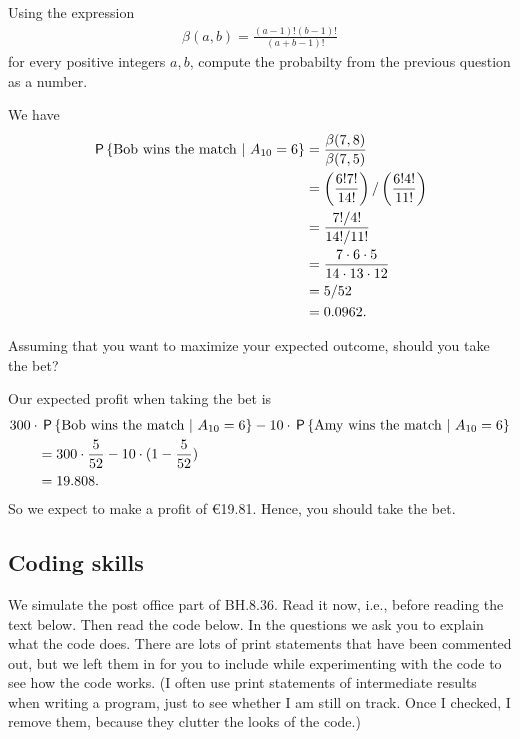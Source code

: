 \documentclass[assignments]{subfiles}
\begin{document}
\begin{exercise}
Using the expression
\begin{align}
    \beta(a,b) = \frac{(a-1)!(b-1)!}{(a+b-1)!}
\end{align}
for every positive integers $a,b$, compute the probabilty from the previous question as a number.
\begin{solution}
We have
\begin{align}
    \P{ \text{Bob wins the match} \ | \ A_{10} = 6 } &= \frac{\beta(7,8)}{\beta(7,5)} \\
    &= \left(\frac{6!7!}{14!}\right)/\left(\frac{6!4!}{11!}\right) \\
    &= \frac{7!/4!}{14!/11!} \\
    &= \frac{7\cdot 6 \cdot 5}{14 \cdot 13 \cdot 12} \\
    &= 5/52 \\
    &= 0.0962.
\end{align}
\end{solution}
\end{exercise}

\begin{exercise}
Assuming that you want to maximize your expected outcome, should you take the bet?
\begin{solution}
Our expected profit when taking the bet is
\begin{align}
    &300 \cdot \P{ \text{Bob wins the match} \ | \ A_{10} = 6 } - 10 \cdot \P{ \text{Amy wins the match} \ | \ A_{10} = 6 } \\
    &\qquad= 300 \cdot \frac{5}{52} - 10 \cdot (1 - \frac{5}{52}) \\
    &\qquad= 19.808.
\end{align}
So we expect to make a profit of €19.81. Hence, you should take the bet.
\end{solution}
\end{exercise}





\subsection{Coding skills}

We simulate the post office part of BH.8.36.
Read it now, i.e., before reading the text below.
Then read the code below.
In the questions we ask you to explain what the code does.
There are lots of print statements that have been commented out, but we left them in for you to include while experimenting with the code to see how the code works.
(I often use print statements of intermediate results when writing a program, just to see whether I am still on track.
Once I checked, I remove them, because they clutter the looks of the code.)
\end{document}
